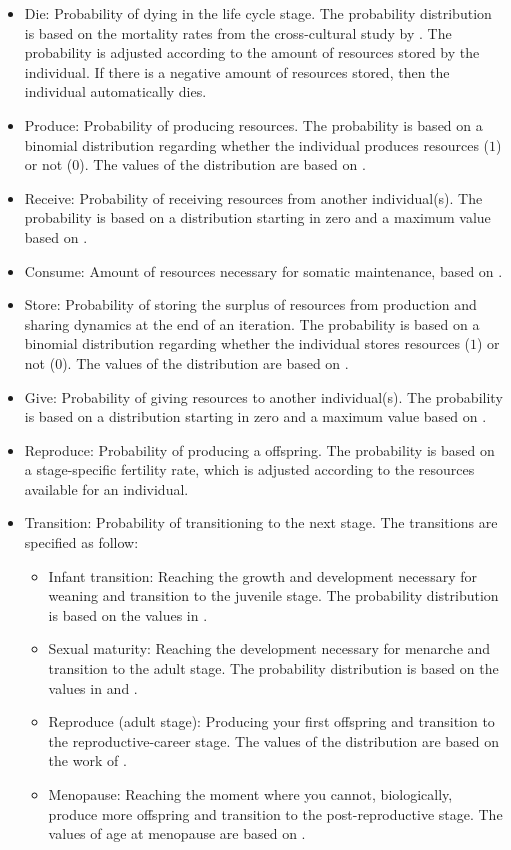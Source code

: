 \documentclass{article}
\begin{document}
\begin{itemize}
    \item Die: Probability of dying in the life cycle stage. The probability distribution is based on the mortality rates from the cross-cultural study by \cite{gurven2007longevity}. The probability is adjusted according to the amount of resources stored by the individual. If there is a negative amount of resources stored, then the individual automatically dies.
    \item Produce: Probability of producing resources. The probability is based on a binomial distribution regarding whether the individual produces resources ($1$) or not ($0$). The values of the distribution are based on \cite{koster2020life}.
    \item Receive: Probability of receiving resources from another individual(s). The probability is based on a distribution starting in zero and a maximum value based on \cite{gurven2004give}.
    \item Consume: Amount of resources necessary for somatic maintenance, based on \cite{kaplan2000theory,pontzer2021daily}.
    \item Store: Probability of storing the surplus of resources from production and sharing dynamics at the end of an iteration. The probability is based on a binomial distribution regarding whether the individual stores resources ($1$) or not ($0$). The values of the distribution are based on \citep{bowles2011cultivation}.
    \item Give: Probability of giving resources to another individual(s). The probability is based on a distribution starting in zero and a maximum value based on \cite{gurven2004give}.
    \item Reproduce: Probability of producing a offspring. The probability is based on a stage-specific fertility rate, which is adjusted according to the resources available for an individual.
    \item Transition: Probability of transitioning to the next stage. The transitions are specified as follow:
    \begin{itemize}
        \item Infant transition: Reaching the growth and development necessary for weaning and transition to the juvenile stage. The probability distribution is based on the values in \cite{wood2017dynamics}.
        \item Sexual maturity: Reaching the development necessary for menarche and transition to the adult stage. The probability distribution is based on the values in \cite{mulder1989menarche} and \cite{kramer2010teen}.
        \item Reproduce (adult stage): Producing your first offspring and transition to the reproductive-career stage. The values of the distribution are based on the work of \cite{wood2017dynamics}.
        \item Menopause: Reaching the moment where you cannot, biologically, produce more offspring and transition to the post-reproductive stage. The values of age at menopause are based on \cite{laisk2019demographic}.
    \end{itemize}
\end{itemize}
\end{document}
